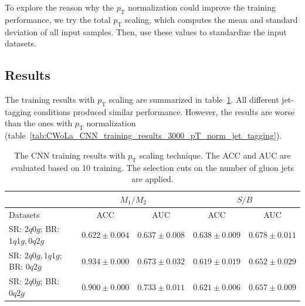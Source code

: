 \documentclass[12pt]{article}
\begin{document}
    To explore the reason why the $p_\text{T}$ normalization could improve the training performance, we try the total $p_{\text{T}}$ scaling, which computes the mean and standard deviation of all input samples. Then, use these values to standardize the input datasets.

    \subsection{Results}%
    \label{sub:results}
        The training results with $p_{\text{T}}$ scaling are summarized in table~\ref{tab:CWoLa_CNN_training_results_3000_jet_tagging_pT_scaling}. All different jet-tagging conditions produced similar performance. However, the results are worse than the ones with $p_{\text{T}}$ normalization (table~\ref{tab:CWoLa_CNN_training_results_3000_pT_norm_jet_tagging}).
        \begin{table}[htpb]
            \centering
            \caption{The CNN training results with $p_{\text{T}}$ scaling technique. The ACC and AUC are evaluated based on 10 training. The selection cuts on the number of gluon jets are applied.}
            \label{tab:CWoLa_CNN_training_results_3000_jet_tagging_pT_scaling}
            \begin{tabular}{l|cc|cc}
                                             & \multicolumn{2}{c|}{$M_1 / M_2$}      & \multicolumn{2}{c}{$S / B$}           \\ \hline
                Datasets                     & ACC               & AUC               & ACC               & AUC               \\ \hline
                SR: $2q0g$; BR: $1q1g, 0q2g$ & $0.622 \pm 0.004$ & $0.637 \pm 0.008$ & $0.638 \pm 0.009$ & $0.678 \pm 0.011$ \\
                SR: $2q0g, 1q1g$; BR: $0q2g$ & $0.934 \pm 0.000$ & $0.673 \pm 0.032$ & $0.619 \pm 0.019$ & $0.652 \pm 0.029$ \\
                SR: $2q0g$; BR: $0q2g$       & $0.900 \pm 0.000$ & $0.733 \pm 0.011$ & $0.621 \pm 0.006$ & $0.657 \pm 0.009$
            \end{tabular}
        \end{table}
\end{document}
